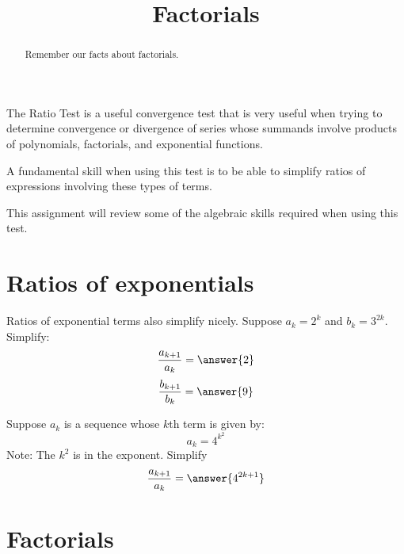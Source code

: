 \documentclass{ximera}
\title[Refresh:]{Factorials}
\begin{document}
\begin{abstract}
  Remember our facts about factorials.
\end{abstract}
\maketitle

\begin{problem}
  The Ratio Test is a useful convergence test that is very useful when
  trying to determine convergence or divergence of series whose
  summands involve products of​ polynomials, factorials, and
  exponential functions.  


  A fundamental skill when using this test is to be able to simplify
  ratios of expressions involving these types of terms.

  This assignment will review some of the algebraic skills required
  when using this test.
  \begin{multipleChoice}
  \end{multipleChoice}
\end{problem}


\section{Ratios of exponentials}


\begin{problem}
  Ratios of exponential terms also simplify nicely. Suppose $a_k=2^k$
  and $b_k=3^{2k}$. Simplify:
  \[
  \frac{a_{k+1}}{a_k} = \answer{2}
  \]
  \[
  \frac{b_{k+1}}{b_k}=\answer{9}
  \]
\end{problem}


\begin{problem}
  Suppose $a_k$ is a sequence whose $k$th term is given​ by:
  \[
  a_k=4^{k^2}
  \]
  Note: The $k^2$ is in the exponent. Simplify
  \[
  \frac{a_{k+1}}{a_k} = \answer{4^{2k+1}}
  \]
\end{problem}

\section{Factorials}
\end{document}
